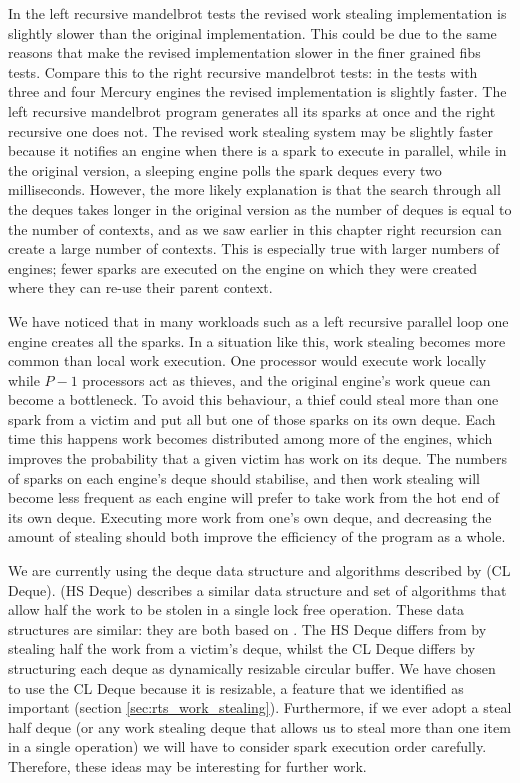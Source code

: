 In the left recursive mandelbrot tests the revised work stealing
implementation is slightly slower than the original implementation.
This could be due to the same reasons that make the revised implementation
slower in the finer grained fibs tests.
Compare this to the right recursive mandelbrot tests:
in the tests with three and four Mercury engines the revised implementation
is slightly faster.
The left recursive mandelbrot program generates all its
sparks at once and the right recursive one does not.
The revised work stealing system may be slightly faster because it
notifies an engine when there is a spark to execute in parallel,
while in the original version, a sleeping engine polls the spark deques
every two milliseconds.
However, the more likely explanation is that the search through all the
deques takes longer in the original version as the number of deques is equal
to the number of contexts,
and as we saw earlier in this chapter right recursion can create a large
number of contexts.
This is especially true with larger numbers of engines;
fewer sparks are executed on the engine on which they were created where
they can re-use their parent context.

We have noticed that in many workloads such as a left recursive parallel
loop one engine creates all the sparks.
In a situation like this,
work stealing becomes more common than local work execution.
One processor would execute work locally while $P - 1$ processors act as
thieves,
and the original engine's work queue can become a bottleneck.
To avoid this behaviour,
a thief could steal more than one spark from a victim and put all but one of
those sparks on its own deque.
Each time this happens work becomes distributed among more of the engines,
which improves the probability that a given victim has work on its deque.
The numbers of sparks on each engine's deque should stabilise,
and then work stealing will become less frequent as each engine will prefer to
take work from the hot end of its own deque.
Executing more work from one's own deque, and decreasing the amount of stealing
should both improve the efficiency of the program as a whole.

We are currently using the deque data structure and algorithms described by
\citet{Chase_2005_wsdeque} (CL Deque).
\citet{hendler:2002:stealhalf} (HS Deque) describes a similar data structure
and set of algorithms that allow half the work to be stolen in a single lock
free operation.
These data structures are similar:
they are both based on \citet{arora:1998:work-stealing}.
The HS Deque differs from 
\citet{arora:1998:work-stealing}
by stealing half the work from a victim's deque,
whilst the CL Deque differs by structuring each deque as
dynamically resizable circular buffer.
We have chosen to use the CL Deque because it is resizable,
a feature that we identified as important (section \ref{sec:rts_work_stealing}).
Furthermore,
if we ever adopt a steal half deque (or any work stealing deque that allows
us to steal more than one item in a single operation) we will have to
consider spark execution order carefully.
Therefore,
these ideas may be interesting for further work.

